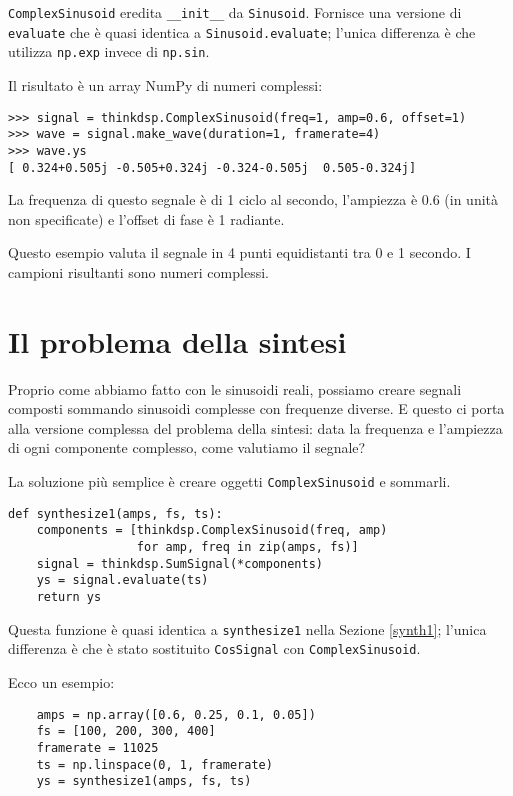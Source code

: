 \documentclass[12pt]{book} \usepackage[width=5.5in,height=8.5in, hmarginratio=3:2,vmarginratio=1:1]{geometry}
\begin{document}
{\tt ComplexSinusoid} eredita \verb"__init__" da {\tt Sinusoid}. Fornisce una versione di {\tt evaluate} che è quasi identica a {\tt Sinusoid.evaluate}; l'unica differenza è che utilizza {\tt np.exp} invece di {\tt np.sin}.

Il risultato è un array NumPy di numeri complessi:

\begin{verbatim} 
>>> signal = thinkdsp.ComplexSinusoid(freq=1, amp=0.6, offset=1)
>>> wave = signal.make_wave(duration=1, framerate=4)
>>> wave.ys
[ 0.324+0.505j -0.505+0.324j -0.324-0.505j  0.505-0.324j]
 \end{verbatim} 

La frequenza di questo segnale è di 1 ciclo al secondo, l'ampiezza è 0.6 (in unità non specificate) e l'offset di fase è 1 radiante.

Questo esempio valuta il segnale in 4 punti equidistanti tra 0 e 1 secondo. I campioni risultanti sono numeri complessi.

\section{Il problema della sintesi} 

Proprio come abbiamo fatto con le sinusoidi reali, possiamo creare segnali composti sommando sinusoidi complesse con frequenze diverse. E questo ci porta alla versione complessa del problema della sintesi: data la frequenza e l'ampiezza di ogni componente complesso, come valutiamo il segnale?

La soluzione più semplice è creare oggetti {\tt ComplexSinusoid} e sommarli.

\begin{verbatim} 
def synthesize1(amps, fs, ts):
    components = [thinkdsp.ComplexSinusoid(freq, amp)
                  for amp, freq in zip(amps, fs)]
    signal = thinkdsp.SumSignal(*components)
    ys = signal.evaluate(ts)
    return ys
 \end{verbatim} 

Questa funzione è quasi identica a {\tt synthesize1} nella Sezione \ref{synth1}; l'unica differenza è che è stato sostituito {\tt CosSignal} con {\tt ComplexSinusoid}.

Ecco un esempio:

\begin{verbatim} 
    amps = np.array([0.6, 0.25, 0.1, 0.05])
    fs = [100, 200, 300, 400]
    framerate = 11025
    ts = np.linspace(0, 1, framerate)
    ys = synthesize1(amps, fs, ts)
 \end{verbatim} 
\end{document}
